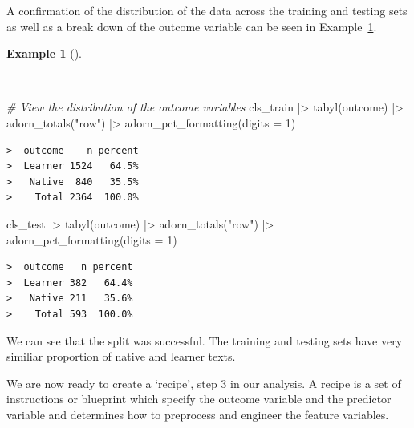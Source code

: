 \documentclass[
  letterpaper,
  DIV=11,
  numbers=noendperiod]{scrreprt}
\newenvironment{Shaded}{\begin{snugshade}}{\end{snugshade}}
\newcommand{\AttributeTok}[1]{\textcolor[rgb]{0.00,0.00,0.00}{#1}}
\newcommand{\CommentTok}[1]{\textcolor[rgb]{0.00,0.00,0.00}{\textit{#1}}}
\newcommand{\DecValTok}[1]{\textcolor[rgb]{0.00,0.00,0.00}{#1}}
\newcommand{\FunctionTok}[1]{\textcolor[rgb]{0.00,0.00,0.00}{#1}}
\newcommand{\NormalTok}[1]{\textcolor[rgb]{0.00,0.00,0.00}{#1}}
\newcommand{\SpecialCharTok}[1]{\textcolor[rgb]{0.00,0.00,0.00}{#1}}
\newcommand{\StringTok}[1]{\textcolor[rgb]{0.00,0.00,0.00}{#1}}
\theoremstyle{definition}
\newtheorem{example}{Example}[chapter]
\theoremstyle{remark}
\begin{document}
A confirmation of the distribution of the data across the training and
testing sets as well as a break down of the outcome variable can be seen
in Example~\ref{exm-pda-class-split-tabyl}.

\begin{example}[]\protect\hypertarget{exm-pda-class-split-tabyl}{}\label{exm-pda-class-split-tabyl}

~

\begin{Shaded}
\begin{Highlighting}[]
\CommentTok{\# View the distribution of the outcome variables}
\NormalTok{cls\_train }\SpecialCharTok{|\textgreater{}}
  \FunctionTok{tabyl}\NormalTok{(outcome) }\SpecialCharTok{|\textgreater{}}
  \FunctionTok{adorn\_totals}\NormalTok{(}\StringTok{"row"}\NormalTok{) }\SpecialCharTok{|\textgreater{}}
  \FunctionTok{adorn\_pct\_formatting}\NormalTok{(}\AttributeTok{digits =} \DecValTok{1}\NormalTok{)}
\end{Highlighting}
\end{Shaded}

\begin{verbatim}
>  outcome    n percent
>  Learner 1524   64.5%
>   Native  840   35.5%
>    Total 2364  100.0%
\end{verbatim}

\begin{Shaded}
\begin{Highlighting}[]
\NormalTok{cls\_test }\SpecialCharTok{|\textgreater{}}
  \FunctionTok{tabyl}\NormalTok{(outcome) }\SpecialCharTok{|\textgreater{}}
  \FunctionTok{adorn\_totals}\NormalTok{(}\StringTok{"row"}\NormalTok{) }\SpecialCharTok{|\textgreater{}}
  \FunctionTok{adorn\_pct\_formatting}\NormalTok{(}\AttributeTok{digits =} \DecValTok{1}\NormalTok{)}
\end{Highlighting}
\end{Shaded}

\begin{verbatim}
>  outcome   n percent
>  Learner 382   64.4%
>   Native 211   35.6%
>    Total 593  100.0%
\end{verbatim}

\end{example}

We can see that the split was successful. The training and testing sets
have very similiar proportion of native and learner texts.

We are now ready to create a `recipe', step 3 in our analysis. A recipe
is a set of instructions or blueprint which specify the outcome variable
and the predictor variable and determines how to preprocess and engineer
the feature variables.
\end{document}
